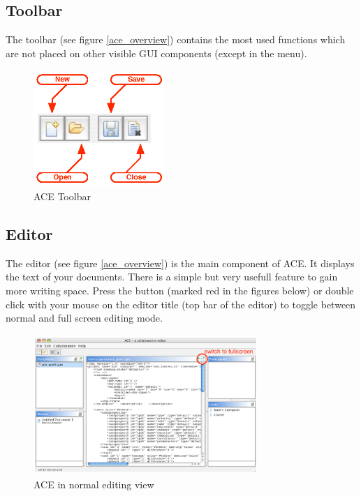 \documentclass[11pt,a4paper]{article}
\begin{document}
\subsection{Toolbar}
The toolbar (see figure \ref{ace_overview}) contains the most used functions which are not placed on other visible GUI components (except in the menu).
\begin{figure}[H]
\begin{center}
  \includegraphics[height=1.74in, width=1.96in]{../images/usermanual/g_toolbar.eps}
\caption{ACE Toolbar}
\label{ace_toolbar}
\end{center}
\end{figure}

\subsection{Editor}
The editor (see figure \ref{ace_overview}) is the main component of ACE. It displays the text of your documents. There is a simple but very usefull feature to gain more writing space. Press the button (marked red in the figures below) or double click with your mouse on the editor title (top bar of the editor) to toggle between normal and full screen editing mode.

\begin{figure}[H]
\begin{center}
  \includegraphics[height=2.09in, width=3.34in]{../images/usermanual/g_editor_normalscreen.eps}
\caption{ACE in normal editing view}
\label{ace_editor_normal}
\end{center}
\end{figure}
\end{document}
